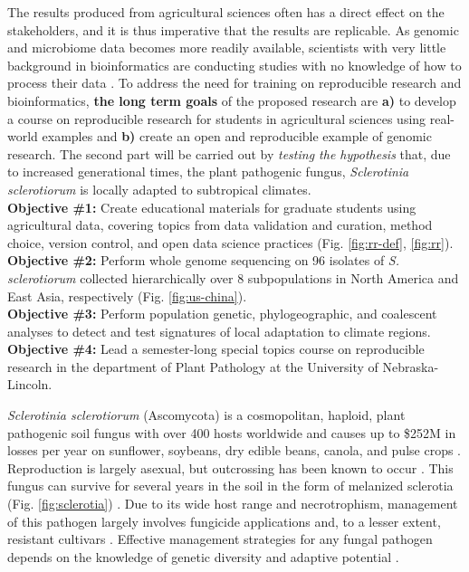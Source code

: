 \documentclass[12pt,letterpaper]{article}
\begin{document}
The results produced from agricultural sciences often has a direct effect on the stakeholders, and it is thus imperative that the results are replicable. 
As genomic and microbiome data becomes more readily available, scientists with very little background in bioinformatics are conducting studies with no knowledge of how to process their data \citep{stewart-lowndes2017path, barone2017unmet}. 
To address the need for training on reproducible research and bioinformatics, \textbf{the long term goals} of the proposed research are \textbf{a)} to develop a course on reproducible research for students in agricultural sciences using real-world examples and \textbf{b)} create an open and reproducible example of genomic research. The second part will be carried out by \textit{testing the hypothesis} that, due to increased generational times, the plant pathogenic fungus, \textit{Sclerotinia sclerotiorum} is locally adapted to subtropical climates.\\
\textbf{Objective \#1:} Create educational materials for graduate students using agricultural data, covering topics from data validation and curation, method choice, version control, and open data science practices (Fig. \ref{fig:rr-def}, \ref{fig:rr}).\\
\textbf{Objective \#2:} Perform whole genome sequencing on 96 isolates of \textit{S. sclerotiorum} collected hierarchically over 8 subpopulations in North America and East Asia, respectively (Fig. \ref{fig:us-china}).\\
\textbf{Objective \#3:} Perform population genetic, phylogeographic, and coalescent analyses to detect and test signatures of local adaptation to climate regions.\\
\textbf{Objective \#4:} Lead a semester-long special topics course on reproducible research in the department of Plant Pathology at the University of Nebraska-Lincoln.

\textit{Sclerotinia sclerotiorum} (Ascomycota) is a cosmopolitan, haploid, plant pathogenic soil fungus with over 400 hosts worldwide \citep{bolton2006sclerotinia} and causes up to \$252M in losses per year on sunflower, soybeans, dry edible beans, canola, and pulse crops \citep{uscanola}.
Reproduction is largely asexual, but outcrossing has been known to occur \citep{bolton2006sclerotinia,attanayake2014inferring}. 
This fungus can survive for several years in the soil in the form of melanized sclerotia (Fig. \ref{fig:sclerotia}) \citep{bolton2006sclerotinia}.
Due to its wide host range and necrotrophism, management of this pathogen largely involves fungicide applications and, to a lesser extent, resistant cultivars \citep{bolton2006sclerotinia}.
Effective management strategies for any fungal pathogen depends on the knowledge of genetic diversity and adaptive potential \citep{grunwald2016population}. 
\end{document}
